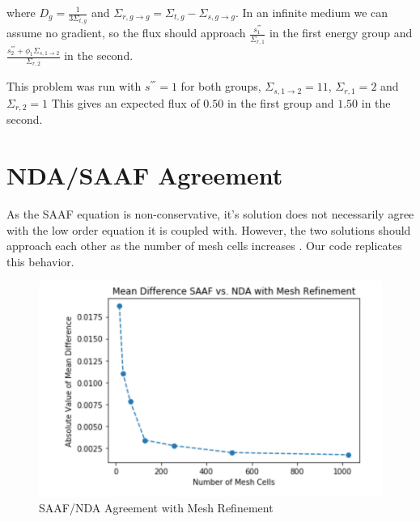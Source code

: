 where $D_g = \frac{1}{3\Sigma_{t, g}}$ and $\Sigma_{r, g \rightarrow g} = \Sigma_{t, g} - \Sigma_{s, g \rightarrow g}$. In an infinite medium we can assume no gradient, so the flux should approach $\frac{s_1^{'''}}{\Sigma_{r, 1}}$ in the first energy group and $\frac{s_2^{'''} + \phi_1 \Sigma_{s, 1 \rightarrow 2}}{\Sigma_{r, 2}}$ in the second.  

This problem was run with $ s^{'''} = 1$ for both groups, $\Sigma_{s, 1\rightarrow 2} = 11$, $\Sigma_{r, 1} = 2$ and $\Sigma_{r, 2} = 1$ This gives an expected flux of $0.50 $ in the first group and $1.50$ in the second. 

\section{NDA/SAAF Agreement}
As the SAAF equation is non-conservative, it's solution does not necessarily agree with the low order equation it is coupled with. However, the two solutions should approach each other as the number of mesh cells increases \cite{Wang2013}. Our code replicates this behavior. 
\begin{figure}
    \centering
    \includegraphics{fig/SAAFvsNDA}
    \caption{SAAF/NDA Agreement with Mesh Refinement}
    \label{fig:SAAFvsNDA}
\end{figure}